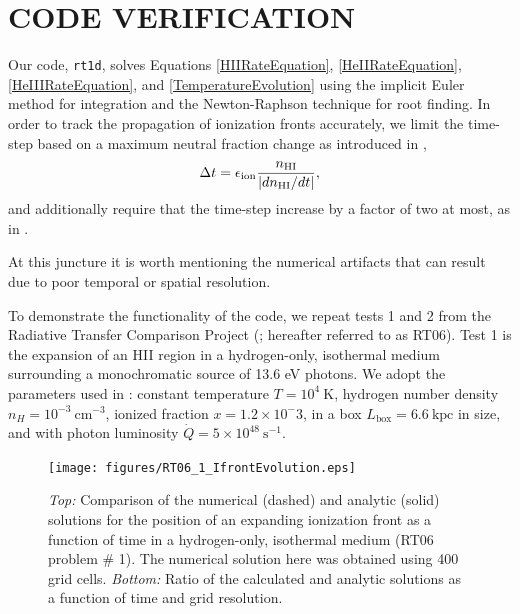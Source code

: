 \documentclass[preprint2]{aastex}              %
\begin{document}
\section{CODE VERIFICATION}
Our code, \texttt{rt1d}, solves Equations \ref{HIIRateEquation}, \ref{HeIIRateEquation}, \ref{HeIIIRateEquation}, and \ref{TemperatureEvolution} using the implicit Euler method for integration and the Newton-Raphson technique for root finding.  In order to track the propagation of ionization fronts accurately, we limit the time-step based on a maximum neutral fraction change as introduced in \cite{Shapiro2004},
\begin{equation}
    \Delta t = \epsilon_{\mathrm{ion}} \frac{n_{\text{HI}}}{|dn_{\text{HI}}/dt|} ,
\end{equation}
and additionally require that the time-step increase by a factor of two at most, as in \cite{Wise2011}.

At this juncture it is worth mentioning the numerical artifacts that can result due to poor temporal or spatial resolution.  

To demonstrate the functionality of the code, we repeat tests 1 and 2 from the Radiative Transfer Comparison Project (\cite{Iliev2006}; hereafter referred to as RT06).  Test 1 is the expansion of an HII region in a hydrogen-only, isothermal medium surrounding a monochromatic source of 13.6 eV photons. We adopt the parameters used in \citet{Wise2011}: constant temperature $T = 10^4 \ \mathrm{K}$, hydrogen number density $n_H = 10^{-3} \ \mathrm{cm^{-3}}$, ionized fraction $x = 1.2 \times 10^-3$, in a box $L_{\mathrm{box}} = 6.6 \ \mathrm{kpc}$ in size, and with photon luminosity $\dot{Q} = 5\times10^{48} \ \mathrm{s^{-1}}$.

\begin{figure}[htbp]
\centering
\texttt{[image: figures/RT06\_1\_IfrontEvolution.eps]}
\caption{\textit{Top:} Comparison of the numerical (dashed) and analytic (solid) solutions for the position of an expanding ionization front as a function of time in a hydrogen-only, isothermal medium (RT06 problem \# 1).  The numerical solution here was obtained using 400 grid cells. \textit{Bottom:} Ratio of the calculated and analytic solutions as a function of time and grid resolution. }
\label{fig:RT_Test1_IfrontEvolution}
\end{figure}
\end{document}
